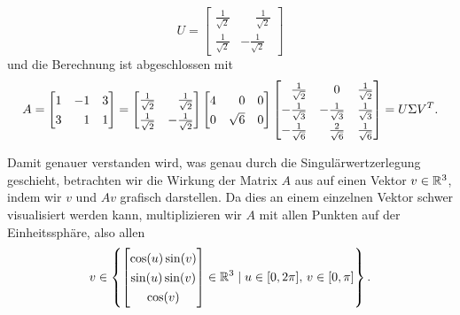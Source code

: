 \begin{example}
\begin{equation*}
        U =
        \begin{bmatrix}
            \frac{1}{\sqrt{2}} & \phantom{-}\frac{1}{\sqrt{2}} \\
            \frac{1}{\sqrt{2}} & -\frac{1}{\sqrt{2}}
        \end{bmatrix}
    \end{equation*}
    und die Berechnung ist abgeschlossen mit
    \begin{equation*}
        A =
        \begin{bmatrix}
            1 & -1 & 3 \\
            3 & \phantom{-}1 & 1
        \end{bmatrix}
        =
        \begingroup
        \renewcommand{\arraystretch}{1.3}
        \begin{bmatrix}
            \frac{1}{\sqrt{2}} & \phantom{-}\frac{1}{\sqrt{2}} \\
            \frac{1}{\sqrt{2}} & -\frac{1}{\sqrt{2}}
        \end{bmatrix}
        \endgroup
        \begin{bmatrix}
            4 & \phantom{\surd}0 & 0 \\
            0 & \sqrt{6} & 0
        \end{bmatrix}
        \begingroup
        \renewcommand{\arraystretch}{1.3}
        \begin{bmatrix}
            \phantom{-}\frac{1}{\sqrt{2}} & \phantom{-}0 & \frac{1}{\sqrt{2}} \\
            -\frac{1}{\sqrt{3}} & -\frac{1}{\sqrt{3}} & \frac{1}{\sqrt{3}} \\
            -\frac{1}{\sqrt{6}} & \phantom{-}\frac{2}{\sqrt{6}} & \frac{1}{\sqrt{6}} \\
        \end{bmatrix}
        \endgroup
        =
        U \Sigma V^{T}.
    \end{equation*}
\end{example}
Damit genauer verstanden wird, was genau durch die Singulärwertzerlegung geschieht, betrachten wir die Wirkung der Matrix \(A\) aus  auf einen Vektor \(v \in \mathbb{R}^{3}\), indem wir \(v\) und \(Av\) grafisch darstellen.  
Da dies an einem einzelnen Vektor schwer visualisiert werden kann, multiplizieren wir \(A\) mit allen Punkten auf der Einheitssphäre, also allen 
\begin{equation*}
    v \in 
    \left\{
    \begin{bmatrix}
        \cos(u)\sin(v) \\ \sin(u)\sin(v) \\ \cos(v)
    \end{bmatrix}
    \in \R^{3}
    \mid
    u \in [0, 2\pi], \, v \in [0, \pi]
    \right\}.
\end{equation*}
